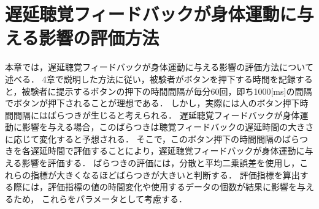 \chapter{遅延聴覚フィードバックが身体運動に与える影響の評価方法}
本章では，遅延聴覚フィードバックが身体運動に与える影響の評価方法について述べる．
4章で説明した方法に従い，被験者がボタンを押下する時間を記録すると，被験者に提示するボタンの押下の時間間隔が毎分60回，即ち1000[ms]の間隔でボタンが押下されることが理想である．
しかし，実際には人のボタン押下時間間隔にはばらつきが生じると考えられる．
遅延聴覚フィードバックが身体運動に影響を与える場合，このばらつきは聴覚フィードバックの遅延時間の大きさに応じて変化すると予想される．
そこで，このボタン押下の時間間隔のばらつきを各遅延時間で評価することにより，遅延聴覚フィードバックが身体運動に与える影響を評価する．
ばらつきの評価には，分散と平均二乗誤差を使用し，これらの指標が大きくなるほどばらつきが大きいと判断する．
評価指標を算出する際には，評価指標の値の時間変化や使用するデータの個数が結果に影響を与えるため，
これらをパラメータとして考慮する．

